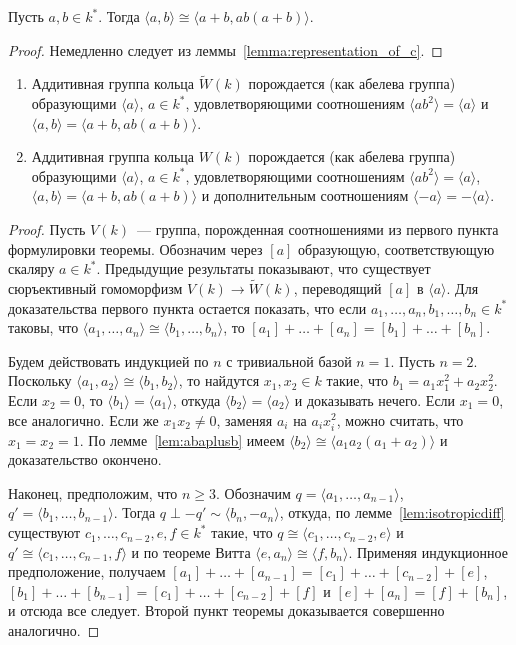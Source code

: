 \documentclass[a4paper,oneside,12pt]{article}
\theoremstyle{plain} { \swapnumbers
\newtheorem{theorem}{Теорема}[subsection]
\newtheorem{corollary}[theorem]{Следствие}
\newtheorem{lemma}[theorem]{Лемма}
\newtheorem{proposition}[theorem]{Утверждение}
\newtheorem{claim}[theorem]{Факт}
}
\theoremstyle{definition} { \swapnumbers
\newtheorem{definition}[theorem]{Определение}
\newtheorem{notation}[theorem]{Обозначение}
\newtheorem{remark}[theorem]{Замечание}
\newtheorem{remarks}[theorem]{Замечания}
\newtheorem{example}[theorem]{Пример}
\newtheorem{examples}[theorem]{Примеры}
\newtheorem{sssection}[theorem]{}
}
\def\tilde{\widetilde}
\def\la{\langle}
\def\ra{\rangle}
\begin{document}
\begin{lemma}\label{lem:abaplusb}
Пусть $a,b\in k^*$. Тогда
$\la a,b\ra\cong\la a+b,ab(a+b)\ra$.
\end{lemma}
\begin{proof}
Немедленно следует из леммы~\ref{lemma:representation_of_c}.
\end{proof}

\begin{theorem}\label{theorem:witt_ring_generators_and_relations}
\begin{enumerate}
\item Аддитивная группа кольца $\tilde W(k)$ порождается (как абелева группа) образующими $\la a\ra$, $a\in k^*$,
удовлетворяющими соотношениям $\la ab^2\ra=\la a\ra$ и $\la a,b\ra=\la a+b,ab(a+b)\ra$.
\item Аддитивная группа кольца $W(k)$ порождается (как абелева группа) образующими $\la a\ra$, $a\in k^*$,
удовлетворяющими соотношениям $\la ab^2\ra=\la a\ra$, $\la a,b\ra=\la a+b,ab(a+b)\ra$ 
и дополнительным соотношениям $\la -a\ra=-\la a\ra$.
\end{enumerate}
\end{theorem}
\begin{proof}
Пусть $V(k)$~--- группа, порожденная соотношениями из первого пункта формулировки теоремы. Обозначим
через $[a]$ образующую, соответствующую скаляру $a\in k^*$. Предыдущие результаты показывают, что
существует сюръективный гомоморфизм $V(k)\to\tilde W(k)$, переводящий $[a]$ в $\la a\ra$.
Для доказательства первого пункта остается показать, что если $a_1,\dots,a_n,b_1,\dots,b_n\in k^*$
таковы, что $\la a_1,\dots,a_n\ra\cong\la b_1,\dots,b_n\ra$, то
$[a_1]+\dots+[a_n]=[b_1]+\dots+[b_n]$.

Будем действовать индукцией по $n$ с тривиальной базой $n=1$. Пусть $n=2$. Поскольку
$\la a_1,a_2\ra\cong\la b_1,b_2\ra$, то найдутся $x_1,x_2\in k$ такие, что $b_1=a_1x_1^2+a_2x_2^2$.
Если $x_2=0$, то $\la b_1\ra=\la a_1\ra$, откуда $\la b_2\ra=\la a_2\ra$ и доказывать нечего.
Если $x_1=0$, все аналогично. Если же $x_1x_2\neq 0$, заменяя $a_i$ на $a_ix_i^2$, можно
считать, что $x_1=x_2=1$. По лемме~\ref{lem:abaplusb} имеем $\la b_2\ra\cong\la a_1a_2(a_1+a_2)\ra$
и доказательство окончено.

Наконец, предположим, что $n\geq 3$. Обозначим $q=\la a_1,\dots,a_{n-1}\ra$, $q'=\la b_1,\dots,b_{n-1}\ra$.
Тогда $q\perp -q'\sim\la b_n,-a_n\ra$, откуда, по лемме~\ref{lem:isotropicdiff} существуют
$c_1,\dots,c_{n-2},e,f\in k^*$ такие, что $q\cong\la c_1,\dots,c_{n-2},e\ra$ и
$q'\cong\la c_1,\dots,c_{n-1},f\ra$ и по теореме Витта $\la e,a_n\ra\cong\la f,b_n\ra$.
Применяя индукционное предположение, получаем $[a_1]+\dots+[a_{n-1}]=[c_1]+\dots+[c_{n-2}]+[e]$,
$[b_1]+\dots+[b_{n-1}]=[c_1]+\dots+[c_{n-2}]+[f]$ и $[e]+[a_n]=[f]+[b_n]$,
и отсюда все следует. Второй пункт теоремы доказывается совершенно аналогично.
\end{proof}
\end{document}
